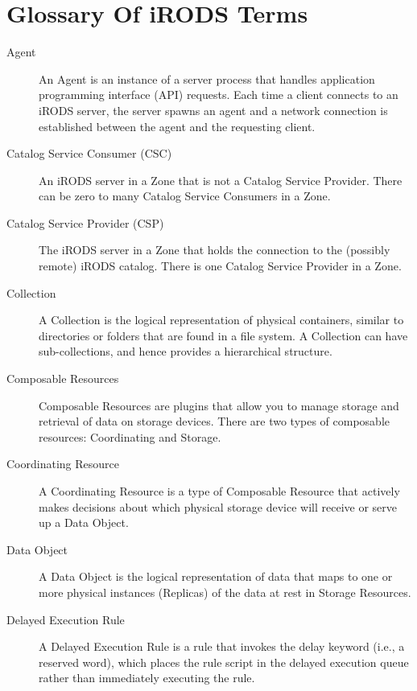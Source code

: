 \documentclass[10pt,oneside]{memoir}
\begin{document}
\chapter{Glossary Of iRODS Terms}

\begin{description}

\item [Agent]
An Agent is an instance of a server process that handles application programming interface (API) requests. Each time a client connects to an iRODS server, the server spawns an agent and a network connection is established between the agent and the requesting client.

\item [Catalog Service Consumer (CSC)]
An iRODS server in a Zone that is not a Catalog Service Provider. There can be zero to many Catalog Service Consumers in a Zone.

\item [Catalog Service Provider (CSP)]
The iRODS server in a Zone that holds the connection to the (possibly remote) iRODS catalog. There is one Catalog Service Provider in a Zone.

\item [Collection]
A Collection is the logical representation of physical containers, similar to directories or folders that are found in a file system. A Collection can have sub-collections, and hence provides a hierarchical structure.

\item [Composable Resources]
Composable Resources are plugins that allow you to manage storage and retrieval of data on storage devices. There are two types of composable resources: Coordinating and Storage.

\item [Coordinating Resource]
A Coordinating Resource is a type of Composable Resource that actively makes decisions about which physical storage device will receive or serve up a Data Object.

\item [Data Object]
A Data Object is the logical representation of data that maps to one or more physical instances (Replicas) of the data at rest in Storage Resources.

\item [Delayed Execution Rule]
A Delayed Execution Rule is a rule that invokes the delay keyword (i.e., a reserved word), which places the rule script in the delayed execution queue rather than immediately executing the rule.


\end{description}
\end{document}
